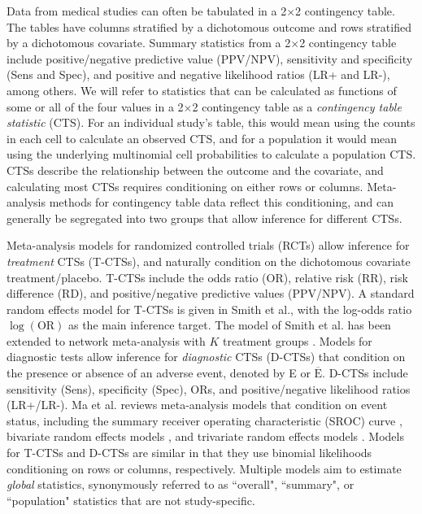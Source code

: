 \documentclass[AMA,STIX1COL]{WileyNJD-v2}
\newcommand{\Ebar}{\overline{\mbox{E}}}
\begin{document}
Data from medical studies can often be tabulated in a 2$\times$2 contingency table. The tables have columns stratified by a dichotomous outcome and rows stratified by a dichotomous covariate. Summary statistics from a 2$\times$2 contingency table include positive/negative predictive value (PPV/NPV), sensitivity and specificity (Sens and Spec), and positive and negative likelihood ratios (LR+ and LR-), among others. We will refer to statistics that can be calculated as functions of some or all of the four values in a 2$\times$2 contingency table as a \textit{contingency table statistic} (CTS). For an individual study's table, this would mean using the counts in each cell to calculate an observed CTS, and for a population it would mean using the underlying multinomial cell probabilities to calculate a population CTS. CTSs describe the relationship between the outcome and the covariate, and calculating most CTSs requires conditioning on either rows or columns. Meta-analysis methods for contingency table data reflect this conditioning, and can generally be segregated into two groups that allow inference for different CTSs. 

Meta-analysis models for randomized controlled trials (RCTs) allow inference for \textit{treatment} CTSs (T-CTSs), and naturally condition on the dichotomous covariate treatment/placebo. T-CTSs include the odds ratio (OR), relative risk (RR), risk difference (RD), and positive/negative predictive values (PPV/NPV). A standard random effects model for T-CTSs is given in Smith et al.\cite{smith1995}, with the log-odds ratio $\log(\mbox{OR})$ as the main inference target. The model of Smith et al.\cite{smith1995} has been extended to network meta-analysis with $K$ treatment groups \cite{lu2004combination, dias2013synthesis, zhang2014network}. Models for diagnostic tests allow inference for \textit{diagnostic} CTSs (D-CTSs) that condition on the presence or absence of an adverse event, denoted by E or $\Ebar$. D-CTSs include sensitivity (Sens), specificity (Spec), ORs, and positive/negative likelihood ratios (LR+/LR-). Ma et al.\cite{ma2016multivariate} reviews meta-analysis models that condition on event status, including the summary receiver operating characteristic (SROC) curve \cite{rutter2001, moses1993, lian2019}, bivariate random effects models \cite{reitsma2005, chu2006, arends2008, chu2012bivariate, guo2017bivariate, hoyer2018meta}, and trivariate random effects models \cite{chu2009, ma2018network, wynants2018trivariate}. Models for T-CTSs and D-CTSs are similar in that they use binomial likelihoods conditioning on rows or columns, respectively. Multiple models \cite{chu2009, rutter2001, ma2018network} aim to estimate \textit{global} statistics, synonymously referred to as ``overall", ``summary", or ``population" statistics that are not study-specific. 
\end{document}
